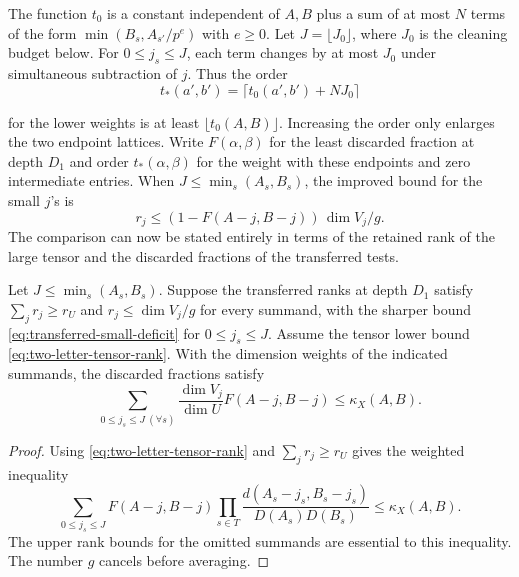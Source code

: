 The function \(t_0\) is a constant independent of \(A,B\)
plus a sum of at most \(N\) terms of the form
\(\min(B_s,A_{s'}/p^e)\) with \(e\ge0\).
Let \(J=\lfloor J_0\rfloor\), where \(J_0\) is the cleaning
budget below. For \(0\le j_s\le J\), each term changes by
at most \(J_0\) under simultaneous subtraction of \(j\).
Thus the order
\[
 t_*(a',b')=\lceil t_0(a',b')+NJ_0\rceil
\]

for the lower weights is at least
\(\lfloor t_0(A,B)\rfloor\). Increasing the order only enlarges
the two endpoint lattices. Write \(F(\alpha,\beta)\) for
the least discarded fraction at depth \(D_1\) and order
\(t_*(\alpha,\beta)\) for the weight with these endpoints
and zero intermediate entries. When \(J\le\min_s(A_s,B_s)\),
the improved bound for the small \(j\)'s is
\begin{equation}\label{eq:transferred-small-deficit}
 r_j\le (1-F(A-j,B-j))\,\dim V_j/g.
\end{equation}
The comparison can now be stated entirely in terms of the
retained rank of the large tensor and the discarded fractions
of the transferred tests.

\begin{lemma}\label{lem:transfer-rank-deficit}
Let \(J\le\min_s(A_s,B_s)\). Suppose the transferred ranks at
depth \(D_1\) satisfy \(\sum_j r_j\ge r_U\) and
\(r_j\le\dim V_j/g\) for every summand, with the sharper bound
\eqref{eq:transferred-small-deficit} for \(0\le j_s\le J\).
Assume the tensor lower bound \eqref{eq:two-letter-tensor-rank}. With the dimension weights of the indicated summands, the discarded fractions satisfy
\[
 \sum_{0\le j_s\le J\ (\forall s)}\frac{\dim V_j}{\dim U}F(A-j,B-j)\le\kappa_X(A,B).
\]

\end{lemma}

\begin{proof}
Using \eqref{eq:two-letter-tensor-rank} and
\(\sum_jr_j\ge r_U\) gives the weighted inequality
\begin{equation}\label{eq:edge-mean-weighted}
 \sum_{0\le j_s\le J} F(A-j,B-j)
    \prod_{s\in T}\frac{d(A_s-j_s,B_s-j_s)}{D(A_s)D(B_s)}
        \le \kappa_X(A,B).
\end{equation}
The upper rank bounds for the omitted summands are essential
to this inequality. The number \(g\) cancels before averaging.

\end{proof}

